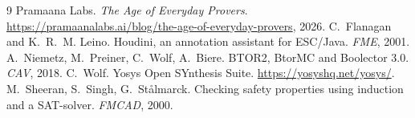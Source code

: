 \documentclass[11pt]{article}
\begin{document}
\begin{thebibliography}{9}
 Pramaana Labs. \emph{The Age of Everyday Provers}.
\url{https://pramaanalabs.ai/blog/the-age-of-everyday-provers}, 2026.
 C.~Flanagan and K.~R.~M. Leino. Houdini, an annotation
assistant for ESC/Java. \emph{FME}, 2001.
 A.~Niemetz, M.~Preiner, C.~Wolf, A.~Biere. BTOR2, BtorMC and
Boolector 3.0. \emph{CAV}, 2018.
 C.~Wolf. Yosys Open SYnthesis Suite.
\url{https://yosyshq.net/yosys/}.
 M.~Sheeran, S.~Singh, G.~St{\aa}lmarck. Checking safety
properties using induction and a SAT-solver. \emph{FMCAD}, 2000.
\end{thebibliography}
\end{document}
